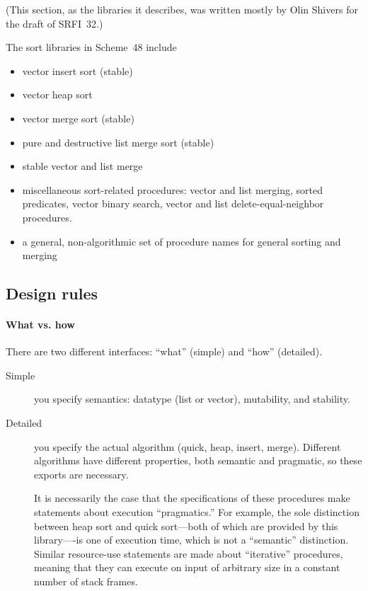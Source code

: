 (This section, as the libraries it describes, was written mostly by
Olin Shivers for the draft of SRFI~32.)



The sort libraries in Scheme~48 include
%
\begin{itemize}
\item vector insert sort (stable)
\item vector heap sort
\item vector merge sort (stable)
\item pure and destructive list merge sort (stable)
\item stable vector and list merge
\item miscellaneous sort-related procedures: vector and list merging, 
  sorted predicates, vector binary search, vector and list 
  delete-equal-neighbor procedures.
\item a general, non-algorithmic set of procedure names for general sorting
  and merging
\end{itemize}

\subsection{Design rules}

\paragraph{What vs. how}

There are two different interfaces: ``what'' (simple) and ``how'' (detailed).

\begin{description}
\item[Simple] you specify semantics: datatype (list or vector), 
  mutability, and stability.
  
\item[Detailed] you specify the actual algorithm (quick, heap,
  insert, merge). Different algorithms have different properties,
  both semantic and pragmatic, so these exports are necessary.
  
  It is necessarily the case that the specifications of these procedures
  make statements about execution ``pragmatics.'' For example, the sole
  distinction between heap sort and quick sort---both of which are
  provided by this library----is one of execution time, which is not a
  ``semantic'' distinction. Similar resource-use statements are made about
  ``iterative'' procedures, meaning that they can execute on input of
  arbitrary size in a constant number of stack frames.
\end{description}

